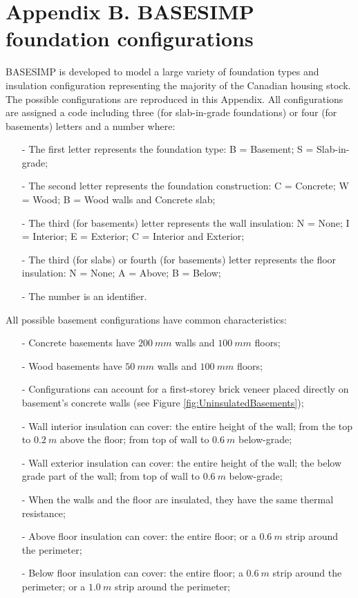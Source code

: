 \chapter{Appendix B. BASESIMP foundation configurations} \label{Appendix:BasesimpConfigurations}

BASESIMP is developed to model a large variety of foundation types and insulation configuration representing the majority of the Canadian housing stock.  The possible configurations are reproduced in this Appendix. All configurations are assigned a code including three (for slab-in-grade foundations) or four (for basements) letters and a number where:
\begin{flushleft}
\begin{itemize}
    \item[-] The first letter represents the foundation type: B = Basement; S = Slab-in-grade;
    \item[-] The second letter represents the foundation construction: C = Concrete; W = Wood; B = Wood walls and Concrete slab;
    \item[-] The third (for basements) letter represents the wall insulation: N = None; I = Interior; E = Exterior; C = Interior and Exterior;
    \item[-] The third (for slabs) or fourth (for basements) letter represents the floor insulation: N = None; A = Above; B = Below;
    \item[-] The number is an identifier.
\end{itemize}
\end{flushleft}

\noindent All possible basement configurations have common characteristics:
\begin{flushleft}
\begin{itemize}
    \item[-] Concrete basements have $200 \: mm$ walls and $100 \: mm$ floors;
    \item[-] Wood basements have $50 \: mm$ walls and $100 \: mm$ floors;
    \item[-] Configurations can account for a first-storey brick veneer placed directly on basement’s concrete walls (see Figure \ref{fig:UninsulatedBasements});
    \item[-] Wall interior insulation can cover: the entire height of the wall; from the top to $0.2 \: m$ above the floor; from top of wall to $0.6 \: m$ below-grade;
    \item[-] Wall exterior insulation can cover: the entire height of the wall; the below grade part of the wall; from top of wall to $0.6 \: m$ below-grade;
    \item[-] When the walls and the floor are insulated, they have the same thermal resistance;
    \item[-] Above floor insulation can cover: the entire floor; or a $0.6 \: m$ strip around the perimeter;
    \item[-] Below floor insulation can cover: the entire floor; a $0.6 \: m$ strip around the perimeter; or a $1.0 \: m$ strip around the perimeter;
\end{itemize}
\end{flushleft}

